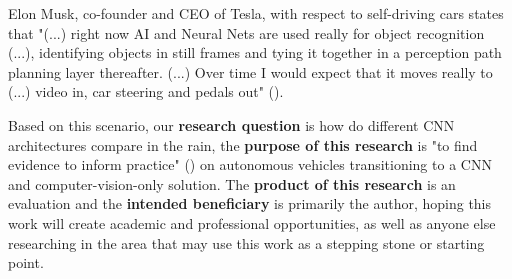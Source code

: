 Elon Musk, co-founder and CEO of Tesla, with respect to self-driving cars states that  "(...) right now AI and Neural Nets are used really for object recognition (...), identifying objects in still frames and tying it together in a perception path planning layer thereafter. (...) Over time I would expect that it moves really to (...) video in, car steering and pedals out" (\cite{TESLAADE:2019}).  

Based on this scenario, our \textbf{research question} is how do different CNN architectures compare in the rain, the \textbf{purpose of this research} is "to find evidence to inform practice" (\cite{Oates:2006}) on autonomous vehicles transitioning to a CNN and computer-vision-only  solution. The \textbf{product of this research} is an evaluation and the \textbf{intended beneficiary} is primarily the author, hoping this work will create academic and professional opportunities, as well as anyone else researching in the area that may use this work as a stepping stone or starting point.